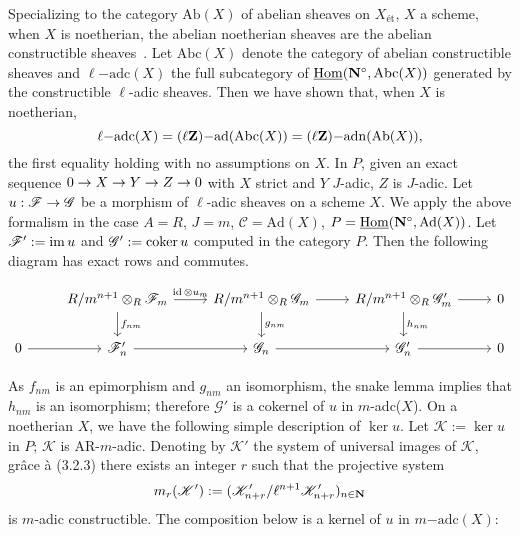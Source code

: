 \documentclass[deligne.tex]{subfiles}
\begin{document}
Specializing to the category $\mathrm{Ab}(X)$ of abelian sheaves on 
$X_{\text{ét}}$, $X$ a scheme, when $X$ is noetherian, the abelian
noetherian sheaves are the abelian constructible sheaves~\cite[IX 2.9]{SGAA}.
Let $\mathrm{Abc}(X)$ denote the category of abelian constructible sheaves
and $\ell\mathrm{-adc}(X)$ the full subcategory of
$\underline{\operatorname{Hom}}(\mathbf{N}^\circ,\mathrm{Abc}(X))$ generated by the
constructible $\ell$-adic sheaves. Then we have shown that, when $X$ is
noetherian,
\begin{equation*}
	\ell\mathrm{-adc}(X)=(\ell\mathbf{Z})\mathrm{-ad}(\mathrm{Abc}(X))
	=(\ell\mathbf{Z})\mathrm{-adn}(\mathrm{Ab}(X)),
\end{equation*}
the first equality holding with no assumptions on $X$.
In $P$, given an exact sequence $0\rightarrow X\rightarrow Y\rightarrow Z\rightarrow 0$ with $X$ strict
and $Y$ $J$-adic, $Z$ is $J$-adic.
Let $u:\mathscr F\rightarrow\mathscr G$ be a morphism of $\ell$-adic sheaves on a
scheme $X$. We apply the above formalism in the case $A=R$, $J=m$,
$\mathcal C=\mathrm{Ad}(X)$, $P=\underline{\operatorname{Hom}}(\mathbf{N}^\circ,\mathrm{Ad}(X))$.
Let $\mathscr F':=\operatorname{im} u$ and $\mathscr G':=\operatorname{coker} u$ computed
in the category $P$. Then the following diagram has exact rows and
commutes.
\begin{ceqn}
\begin{equation*}
\begin{tikzcd}
	&R/m^{n+1}\otimes_R\mathscr F_m\arrow[r,"\id\otimes u_m"]\arrow[d,"f_{nm}"]& R/m^{n+1}\otimes_R\mathscr G_m\arrow[r]\arrow[d,"g_{nm}"]&
	R/m^{n+1}\otimes_R\mathscr G'_m\arrow[d,"h_{nm}"]\arrow[r]&0 \\
	0\arrow[r]&\mathscr F'_n\arrow[r]&\mathscr G_n\arrow[r]
	&\mathscr G'_n\arrow[r]&0
\end{tikzcd}
\end{equation*}
\end{ceqn}
As $f_{nm}$ is an epimorphism and $g_{nm}$ an isomorphism, the snake lemma
implies that $h_{nm}$ is an isomorphism; therefore $\mathscr G'$ is a
cokernel of $u$ in $m$-adc($X$).
On a noetherian $X$, we have the following simple description of $\ker u$.
Let $\mathscr K:=\ker u$ in $P$; $\mathscr K$ is AR-$m$-adic.
Denoting by $\mathscr K'$ the system of universal images of $\mathscr K$, 
grâce à (3.2.3) there exists an integer $r$ such that the projective system
\begin{equation*}
	m_r(\mathscr K'):=(\mathscr K'_{n+r}/\ell^{n+1}\mathscr K'_{n+r})_{n\in\mathbf{N}}
\end{equation*}
is $m$-adic constructible. The composition below is a kernel of
$u$ in $m\mathrm{-adc}(X)$:
\end{document}
